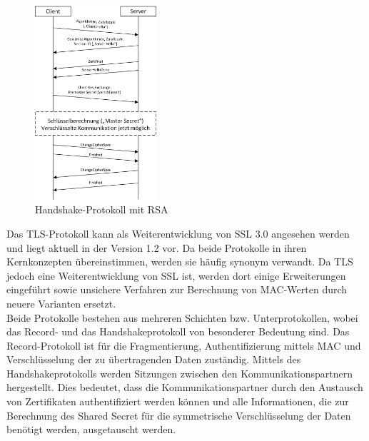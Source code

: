 \documentclass  [paper=a4,
				fontsize=12pt,
				listof=totoc,
				bibliography=totoc
				]{scrreprt}
\begin{document}
			\begin{figure} %
				\centering
				\includegraphics[width=0.4\textwidth]{images/MSC_Transport.png}
				\caption[Handshake-Protokoll mit RSA]{Handshake-Protokoll mit RSA\footnotemark} %
				\label{img:MSC_Transport} %
			\end{figure} 
			Das \ac{TLS}-Protokoll kann als Weiterentwicklung von \ac{SSL} 3.0 angesehen werden und liegt aktuell in der Version 1.2 vor.
			Da beide Protokolle in ihren Kernkonzepten übereinstimmen, werden sie häufig synonym verwandt. Da \ac{TLS} jedoch eine Weiterentwicklung von \ac{SSL} ist, werden dort einige Erweiterungen eingeführt sowie unsichere Verfahren zur Berechnung von \ac{MAC}-Werten durch neuere Varianten ersetzt.\medskip\\
			Beide Protokolle bestehen aus mehreren Schichten bzw. Unterprotokollen, wobei das Record- und das Handshakeprotokoll von besonderer Bedeutung sind. 
			Das Record-Protokoll ist für die Fragmentierung, Authentifizierung mittels \ac{MAC} und Verschlüsselung der zu übertragenden Daten zuständig. 
			Mittels des Handshakeprotokolls werden Sitzungen zwischen den Kommunikationspartnern hergestellt. 
			Dies bedeutet, dass die Kommunikationspartner durch den Austausch von Zertifikaten authentifiziert werden können und alle Informationen, die zur Berechnung des Shared Secret für die symmetrische Verschlüsselung der Daten benötigt werden, ausgetauscht werden. 
\end{document}
